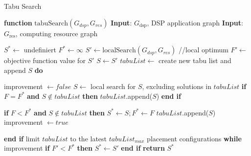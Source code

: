 \documentclass{article}
\begin{document}
\begin{algorithm}[H]
    \caption{Tabu Search}
    \begin{algorithmic}[1]
        \STATE \textbf{function} $\mathrm{tabuSearch}(G_{dsp}, G_{res})$
        \STATE \textbf{Input}: $G_{\text{dsp}}$, DSP application graph
        \STATE \textbf{Input}: $G_{\text{res}}$, computing resource graph

        \STATE $S^* \leftarrow$ undefiniert
        \STATE $F^* \leftarrow \infty$
        \STATE $S' \leftarrow \text{localSearch}(G_{dsp}, G_{res})$   //local optimum
        \STATE $F' \leftarrow$ objective function value for $S'$
        \STATE $S  \leftarrow S'$
        \STATE $tabuList \leftarrow$ create new tabu list and append $S$
        \STATE \textbf{do}

        \STATE \hspace{\algorithmicindent} improvement $\leftarrow false$
        \STATE \hspace{\algorithmicindent} $S \leftarrow$  local search for $S$, excluding solutions in $tabuList$
        \STATE \hspace{\algorithmicindent} \textbf{if} $F = F^*$ \textbf{and} $S \notin tabuList$ \textbf{then} $tabuList$.append($S$) 
        \STATE \hspace{\algorithmicindent} \textbf{end if}

        \STATE \hspace{\algorithmicindent} \textbf{if} $F < F^*$ \textbf{and} $S \notin tabuList$ \textbf{then} 
        \STATE \hspace{\algorithmicindent} \hspace{\algorithmicindent} $S^* \leftarrow S; F^* \leftarrow F$
        \STATE \hspace{\algorithmicindent} \hspace{\algorithmicindent} $tabuList$.append($S$)
        \STATE \hspace{\algorithmicindent} \hspace{\algorithmicindent} improvement $\leftarrow true$

        \STATE \hspace{\algorithmicindent} \textbf{end if}
        \STATE \hspace{\algorithmicindent} limit $tabuList$ to the latest $tabuList_{max}$ placement configurations
        \STATE \textbf{while} improvement
        \STATE \textbf{if} $F' < F^*$ \textbf{then} $S^* \leftarrow S'$ \textbf{end if}
        \STATE \textbf{return} $S^*$

    \end{algorithmic}
\end{algorithm}
\end{document}
